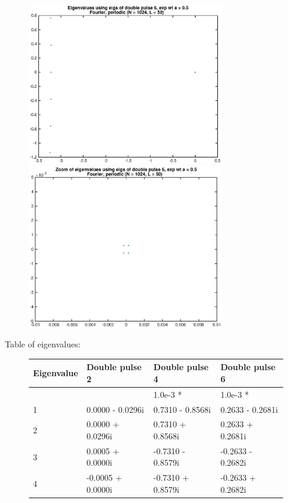 \documentclass[12pt]{article}
\begin{document}
\begin{figure}[H]
\includegraphics[width=8.5cm]{fourierD6eigs.eps}
\includegraphics[width=8.5cm]{fourierD6eigszoom.eps}
\end{figure}

Table of eigenvalues:
\begin{figure}[H]
\begin{tabular}{l|lll}
Eigenvalue & Double pulse 2 & Double pulse 4 & Double pulse 6  \\ \hline
      &                     &  1.0e-3 *             & 1.0e-3 * \\
1     &    0.0000 - 0.0296i &     0.7310 - 0.8568i  &    0.2633 - 0.2681i      \\
2     &    0.0000 + 0.0296i &     0.7310 + 0.8568i  &    0.2633 + 0.2681i      \\
3     &    0.0005 + 0.0000i &    -0.7310 - 0.8579i  &   -0.2633 - 0.2682i      \\
4     &   -0.0005 + 0.0000i &    -0.7310 + 0.8579i  &   -0.2633 + 0.2682i      \\       
\end{tabular}
\end{figure}
\end{document}
